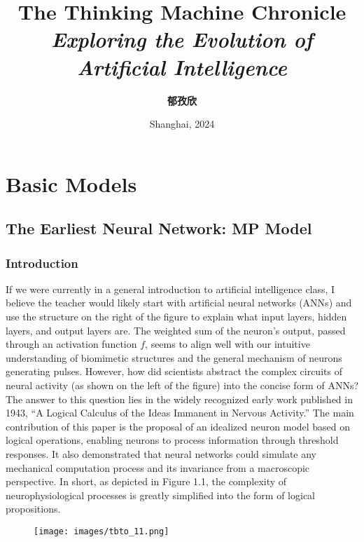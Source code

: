 \documentclass[11p,oneside]{book}
\title{\Huge\textbf{The Thinking Machine Chronicle} \\[1.5cm]
       \Large\textit{Exploring the Evolution of Artificial Intelligence}}
\author{\Large\textbf{郁孜欣} \\[3cm]
\date{Shanghai, 2024}
}
\begin{document}

\maketitle

\begingroup
\let\cleardoublepage\clearpage
\tableofcontents
\endgroup
\thispagestyle{empty}

\makeatletter\@openrightfalse

\part{Basic Models}

\chapter{The Earliest Neural Network: MP Model}

\section{Introduction}

If we were currently in a general introduction to artificial intelligence class, I believe the teacher would likely start with artificial neural networks (ANNs) and use the structure on the right of the figure to explain what input layers, hidden layers, and output layers are. The weighted sum of the neuron’s output, passed through an activation function $f$, seems to align well with our intuitive understanding of biomimetic structures and the general mechanism of neurons generating pulses. However, how did scientists abstract the complex circuits of neural activity (as shown on the left of the figure) into the concise form of ANNs? 
\\

The answer to this question lies in the widely recognized early work published in 1943, “A Logical Calculus of the Ideas Immanent in Nervous Activity.” The main contribution of this paper is the proposal of an idealized neuron model based on logical operations, enabling neurons to process information through threshold responses. It also demonstrated that neural networks could simulate any mechanical computation process and its invariance from a macroscopic perspective. In short, as depicted in Figure 1.1, the complexity of neurophysiological processes is greatly simplified into the form of logical propositions.

\begin{figure}[H]
        \centering
        \texttt{[image: images/tbto\_11.png]}
\end{figure}
\end{document}

